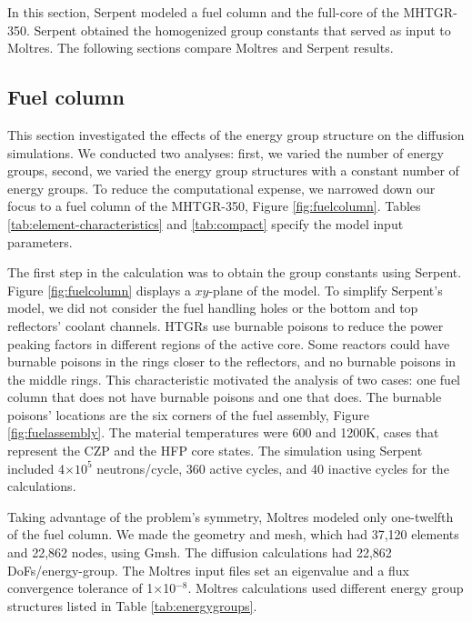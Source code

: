 In this section, Serpent modeled a fuel column and the full-core of the MHTGR-350.
Serpent obtained the homogenized group constants that served as input to Moltres.
The following sections compare Moltres and Serpent results.

\subsection{Fuel column}

This section investigated the effects of the energy group structure on the diffusion simulations.
We conducted two analyses: first, we varied the number of energy groups, second, we varied the energy group structures with a constant number of energy groups.
To reduce the computational expense, we narrowed down our focus to a fuel column of the MHTGR-350, Figure \ref{fig:fuelcolumn}.
Tables \ref{tab:element-characteristics} and \ref{tab:compact} specify the model input parameters.

The first step in the calculation was to obtain the group constants using Serpent.
Figure \ref{fig:fuelcolumn} displays a $xy$-plane of the model.
To simplify Serpent's model, we did not consider the fuel handling holes or the bottom and top reflectors' coolant channels.
\glspl{HTGR} use burnable poisons to reduce the power peaking factors in different regions of the active core.
Some reactors could have burnable poisons in the rings closer to the reflectors, and no burnable poisons in the middle rings.
This characteristic motivated the analysis of two cases: one fuel column that does not have burnable poisons and one that does.
The burnable poisons' locations are the six corners of the fuel assembly, Figure \ref{fig:fuelassembly}.
The material temperatures were 600 and 1200K, cases that represent the \gls{CZP} and the \gls{HFP} core states.
The simulation using Serpent included 4$\times 10^5$ neutrons/cycle, 360 active cycles, and 40 inactive cycles for the calculations.

Taking advantage of the problem's symmetry, Moltres modeled only one-twelfth of the fuel column.
We made the geometry and mesh, which had 37,120 elements and 22,862 nodes, using Gmsh.
The diffusion calculations had 22,862 \glspl{DoF}/energy-group.
The Moltres input files set an eigenvalue and a flux convergence tolerance of 1$\times$10$^{-8}$.
Moltres calculations used different energy group structures listed in Table \ref{tab:energygroups}.

